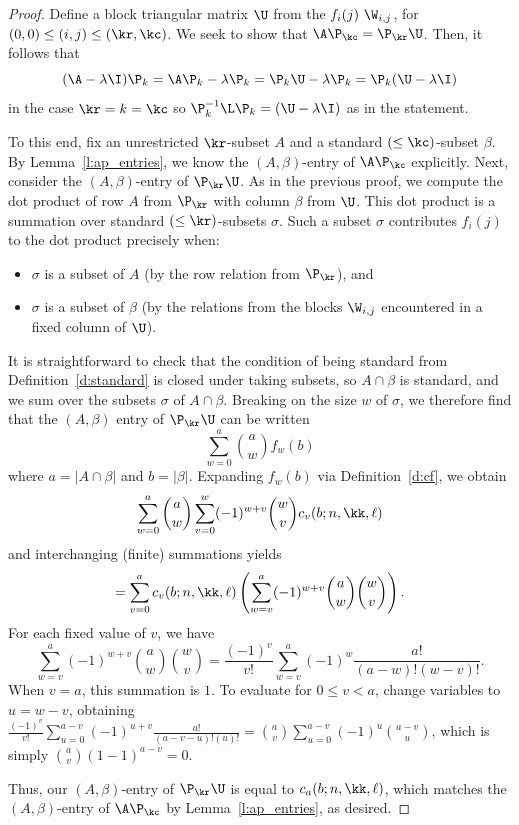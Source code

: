 \begin{proof}
Define a block triangular matrix $\U$ from the $f_i(j) \ \W_{i,j}$, for $(0, 0) \leq (i, j) \leq (\kr, \kc)$.  We 
seek to show that $\A \P_{\kc} = \P_{\kr} \U$.  Then, it follows that 
\[ (\A - \lambda \I) \P_k = \A \P_k - \lambda \P_k = \P_k \U - \lambda \P_k = \P_k (\U - \lambda \I) \]
in the case $\kr = k = \kc$ so $\P_k^{-1} \L \P_k = (\U - \lambda \I)$ as in the statement.

To this end, fix an unrestricted $\kr$-subset $A$ and a standard $(\leq \kc)$-subset $\beta$.
By Lemma~\ref{l:ap_entries}, we know the $(A, \beta)$-entry of $\A \P_{\kc}$
explicitly.  Next, consider the $(A, \beta)$-entry of $\P_{\kr} \U$.
As in the previous proof, we compute the dot product of row $A$ from $\P_{\kr}$ with column $\beta$ from $\U$.  This dot product is a summation over standard $(\leq \kr)$-subsets $\sigma$.  Such a subset $\sigma$ contributes $f_i(j)$ to the dot product precisely when:
\begin{itemize}
    \item $\sigma$ is a subset of $A$ (by the row relation from $\P_{\kr}$), and
    \item $\sigma$ is a subset of $\beta$ (by the relations from the blocks $\W_{i,j}$ encountered in a fixed column of $\U$).
\end{itemize}

It is straightforward to check that the condition of being standard from Definition~\ref{d:standard} is closed under taking subsets, so $A \cap \beta$ is standard, and we sum over the subsets $\sigma$ of $A \cap \beta$.  Breaking on the size $w$ of $\sigma$, we therefore find that the $(A, \beta)$ entry of $\P_{\kr} \U$ can be written 
\[ \sum_{w = 0}^a \binom{a}{w} f_w(b) \]
where $a = |A \cap \beta|$ and $b = |\beta|$.  Expanding $f_w(b)$ via Definition~\ref{d:cf}, we obtain
\[ \sum_{w = 0}^a \binom{a}{w} \sum_{v=0}^w (-1)^{w+v} \binom{w}{v} c_v(b; n, \kk, \ell) \]
and interchanging (finite) summations yields
\[ = \sum_{v = 0}^a c_v(b; n, \kk, \ell) \left(\sum_{w=v}^a (-1)^{w+v} \binom{a}{w}  \binom{w}{v}\right). \]
For each fixed value of $v$, we have
\[\sum_{w=v}^a (-1)^{w+v} \binom{a}{w}  \binom{w}{v} = \frac{(-1)^v}{v!} \sum_{w = v}^a (-1)^{w} \frac{a!}{(a-w)!(w-v)!}.\]
When $v = a$, this summation is $1$.  To evaluate for $0 \leq v < a$, change variables to $u = w-v$, obtaining
$\frac{(-1)^v}{v!} \sum_{u = 0}^{a-v} (-1)^{u+v} \frac{a!}{(a-v-u)!(u)!} = \binom{a}{v} \sum_{u = 0}^{a-v} (-1)^{u} \binom{a-v}{u}$,
which is simply $\binom{a}{v} (1-1)^{a-v} = 0$.

Thus, our $(A,\beta)$-entry of $\P_{\kr}\U$ is equal to $c_a(b; n, \kk, \ell)$, which matches the $(A, \beta)$-entry of $\A\P_{\kc}$ by Lemma~\ref{l:ap_entries}, as desired.
\end{proof}



